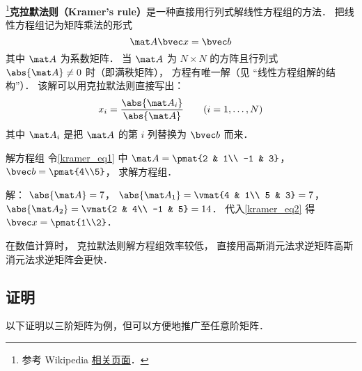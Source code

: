 
\begin{issues}
\issueTODO
\end{issues}


\footnote{参考 Wikipedia \href{https://en.wikipedia.org/wiki/Cramer's_rule}{相关页面}．}\textbf{克拉默法则（Kramer's rule）}是一种直接用行列式解线性方程组的方法． 把线性方程组记为矩阵乘法的形式
\begin{equation}\label{kramer_eq1}
\mat A \bvec x = \bvec b
\end{equation}
其中 $\mat A$ 为系数矩阵． 当 $\mat A$ 为 $N\times N$ 的方阵且行列式 $\abs{\mat A} \ne 0$ 时（即满秩矩阵）， 方程有唯一解（见 “线性方程组解的结构”）． 该解可以用克拉默法则直接写出：
\begin{equation}\label{kramer_eq2}
x_i = \frac{\abs{\mat A_i}}{\abs{\mat A}} \qquad (i = 1, \dots, N)
\end{equation}
其中 $\mat A_i$ 是把 $\mat A$ 的第 $i$ 列替换为 $\bvec b$ 而来．

\begin{example}{解方程组}
令\autoref{kramer_eq1} 中 $\mat A = \pmat{2 & 1\\ -1 & 3}$， $\bvec b = \pmat{4\\5}$， 求解方程组．

解： $\abs{\mat A} = 7$， $\abs{\mat A_1} = \vmat{4 & 1\\ 5 & 3} = 7$， $\abs{\mat A_2} = \vmat{2 & 4\\ -1 & 5} = 14$． 代入\autoref{kramer_eq2} 得 $\bvec x = \pmat{1\\2}$．
\end{example}

在数值计算时， 克拉默法则解方程组效率较低， 直接用高斯消元法求逆矩阵高斯消元法求逆矩阵会更快．

\subsection{证明}
以下证明以三阶矩阵为例，但可以方便地推广至任意阶矩阵．

